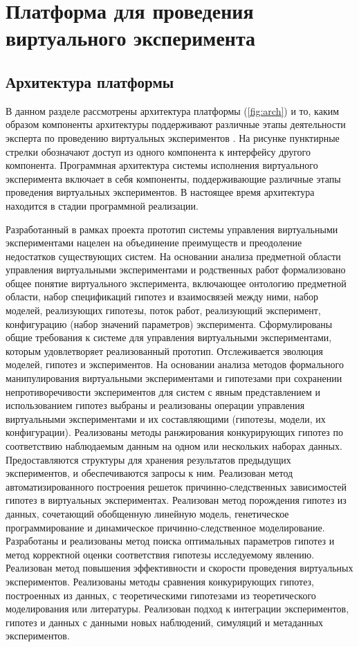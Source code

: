 \chapter{Платформа для проведения виртуального эксперимента} \label{chapt4}


\section{Архитектура платформы}\label{sect_4_2}
В данном разделе рассмотрены архитектура платформы (\cref{fig:arch}) и то, каким образом компоненты архитектуры 
поддерживают различные этапы деятельности эксперта по проведению виртуальных экспериментов 
\cite{kovalev2020architecture}. 
На рисунке пунктирные стрелки обозначают доступ из одного компонента к интерфейсу другого компонента. Программная 
архитектура системы исполнения виртуального эксперимента включает в себя компоненты, поддерживающие различные этапы 
проведения виртуальных экспериментов. В настоящее время архитектура находится в стадии программной реализации.

Разработанный в рамках проекта прототип системы управления виртуальными экспериментами нацелен на объединение 
преимуществ и преодоление недостатков существующих систем. На основании анализа предметной области управления 
виртуальными экспериментами и родственных работ формализовано общее понятие виртуального эксперимента, включающее 
онтологию предметной области, набор спецификаций гипотез и взаимосвязей между ними, набор моделей, реализующих 
гипотезы, поток работ, реализующий эксперимент, конфигурацию (набор значений параметров) эксперимента. Сформулированы 
общие требования к системе для управления виртуальными экспериментами, которым удовлетворяет реализованный прототип. 
Отслеживается эволюция моделей, гипотез и экспериментов. На основании анализа методов формального манипулирования 
виртуальными экспериментами и гипотезами при сохранении непротиворечивости экспериментов для систем с явным 
представлением и использованием гипотез выбраны и реализованы операции управления виртуальными экспериментами и 
их составляющими (гипотезы, модели, их конфигурации). Реализованы методы ранжирования конкурирующих гипотез по 
соответствию наблюдаемым данным на одном или нескольких наборах данных. Предоставляются структуры для хранения 
результатов предыдущих экспериментов, и обеспечиваются запросы к ним. Реализован метод автоматизированного построения 
решеток причинно-следственных зависимостей гипотез в виртуальных экспериментах. Реализован метод порождения гипотез 
из данных, сочетающий обобщенную линейную модель, генетическое программирование и динамическое причинно-следственное 
моделирование. Разработаны и реализованы метод поиска оптимальных параметров гипотез и метод корректной оценки 
соответствия гипотезы исследуемому явлению. Реализован метод повышения эффективности и скорости проведения виртуальных 
экспериментов. Реализованы методы сравнения конкурирующих гипотез, построенных из данных, с теоретическими гипотезами 
из теоретического моделирования или литературы. Реализован подход к интеграции экспериментов, гипотез и данных с 
данными новых наблюдений, симуляций и метаданных экспериментов.

